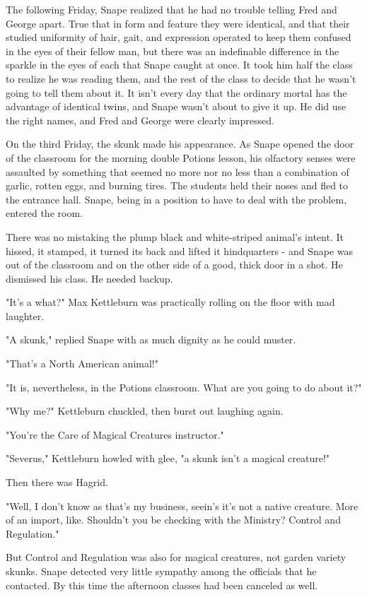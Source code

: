 The following Friday, Snape realized that he had no trouble telling Fred and George apart. True that in form and feature they were identical, and that their studied uniformity of hair, gait, and expression operated to keep them confused in the eyes of their fellow man, but there was an indefinable difference in the sparkle in the eyes of each that Snape caught at once. It took him half the class to realize he was reading them, and the rest of the class to decide that he wasn't going to tell them about it. It isn't every day that the ordinary mortal has the advantage of identical twins, and Snape wasn't about to give it up. He did use the right names, and Fred and George were clearly impressed.

On the third Friday, the skunk made his appearance. As Snape opened the door of the classroom for the morning double Potions lesson, his olfactory senses were assaulted by something that seemed no more nor no less than a combination of garlic, rotten eggs, and burning tires. The students held their noses and fled to the entrance hall. Snape, being in a position to have to deal with the problem, entered the room.

There was no mistaking the plump black and white-striped animal's intent. It hissed, it stamped, it turned its back and lifted it hindquarters - and Snape was out of the classroom and on the other side of a good, thick door in a shot. He dismissed his class. He needed backup.

"It's a what?" Max Kettleburn was practically rolling on the floor with mad laughter.

"A skunk," replied Snape with as much dignity as he could muster.

"That's a North American animal!"

"It is, nevertheless, in the Potions classroom. What are you going to do about it?"

"Why me?" Kettleburn chuckled, then burst out laughing again.

"You're the Care of Magical Creatures instructor."

"Severus," Kettleburn howled with glee, "a skunk isn't a magical creature!"

Then there was Hagrid.

"Well, I don't know as that's my business, seein's it's not a native creature. More of an import, like. Shouldn't you be checking with the Ministry? Control and Regulation."

But Control and Regulation was also for magical creatures, not garden variety skunks. Snape detected very little sympathy among the officials that he contacted. By this time the afternoon classes had been canceled as well.

